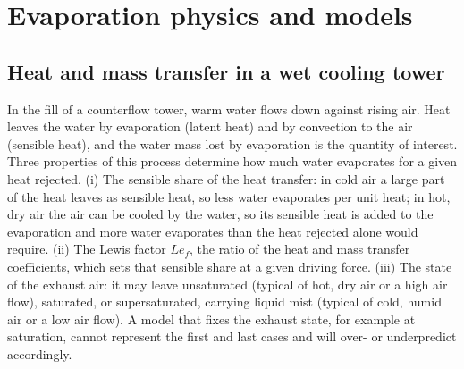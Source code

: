 \documentclass[preprint,12pt]{elsarticle}
\begin{document}
\section{Evaporation physics and models}\label{sec:physics}
\subsection{Heat and mass transfer in a wet cooling tower}\label{sec:poppe}
In the fill of a counterflow tower, warm water flows down against rising air. Heat leaves the water by evaporation
(latent heat) and by convection to the air (sensible heat), and the water mass lost by evaporation is the quantity of
interest. Three properties of this process determine how much water evaporates for a given heat rejected. (i) The
sensible share of the heat transfer: in cold air a large part of the heat leaves as sensible heat, so less water
evaporates per unit heat; in hot, dry air the air can be cooled by the water, so its sensible heat is added to the
evaporation and more water evaporates than the heat rejected alone would require. (ii) The Lewis factor $Le_f$, the
ratio of the heat and mass transfer coefficients, which sets that sensible share at a given driving force. (iii) The
state of the exhaust air: it may leave unsaturated (typical of hot, dry air or a high air flow), saturated, or
supersaturated, carrying liquid mist (typical of cold, humid air or a low air flow). A model that fixes the exhaust
state, for example at saturation, cannot represent the first and last cases and will over- or underpredict accordingly.
\end{document}
